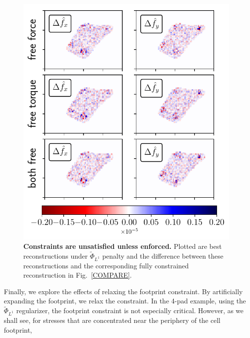 \documentclass[aps,prl,reprint,twocolumn,groupedaddress,showpacs]{revtex4}
\begin{document}
\begin{figure}
\includegraphics[width=\linewidth]{fig6}
\caption{\textbf{Constraints are unsatisfied unless enforced.} Plotted are best reconstructions
  under $\tilde{\Phi}_{L^{1}}$ penalty and the difference between
  these reconstructions and the corresponding fully constrained
  reconstruction in Fig.~\ref{COMPARE}. }
\label{fig:fig3}
\end{figure}

Finally, we explore the effects of relaxing the footprint constraint. 
By artificially expanding the footprint, we relax the 
constraint. In the 4-pad example, using the $\tilde{\Phi}_{L^{1}}$
regularizer, the footprint constraint is not 
especially critical. However, as we shall see, for stresses that are concentrated 
near the periphery of the cell footprint, 

\end{document}
